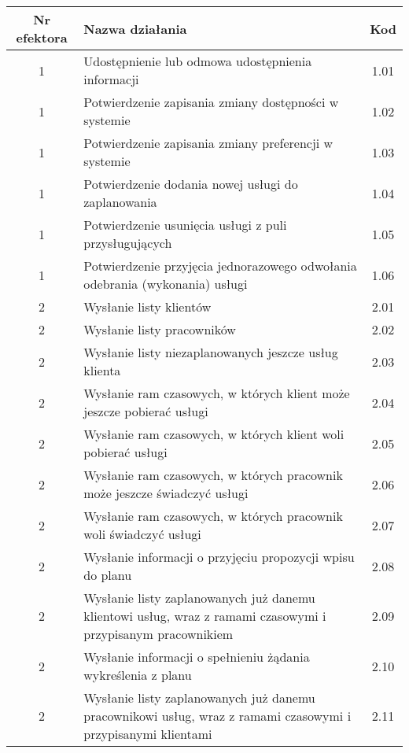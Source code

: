 \begin{tabular}{c|p{5cm}|c}
Nr efektora & Nazwa działania & Kod\\
\hline
1 & Udostępnienie lub odmowa udostępnienia informacji & 1.01\\
1 & Potwierdzenie zapisania zmiany dostępności w systemie & 1.02\\
1 & Potwierdzenie zapisania zmiany preferencji w systemie & 1.03\\
1 & Potwierdzenie dodania nowej usługi do zaplanowania & 1.04\\
1 & Potwierdzenie usunięcia usługi z puli przysługujących & 1.05\\
1 & Potwierdzenie przyjęcia jednorazowego odwołania odebrania (wykonania) usługi & 1.06\\
\hline
2 & Wysłanie listy klientów & 2.01\\
2 & Wysłanie listy pracowników & 2.02\\
2 & Wysłanie listy niezaplanowanych jeszcze usług klienta & 2.03\\
2 & Wysłanie ram czasowych, w których klient może jeszcze pobierać usługi & 2.04\\
2 & Wysłanie ram czasowych, w których klient woli pobierać usługi & 2.05 \\
2 & Wysłanie ram czasowych, w których pracownik może jeszcze świadczyć usługi & 2.06 \\
2 & Wysłanie ram czasowych, w których pracownik woli świadczyć usługi & 2.07\\
2 & Wysłanie informacji o przyjęciu propozycji wpisu do planu & 2.08\\
2 & Wysłanie listy zaplanowanych już danemu klientowi usług, wraz z ramami czasowymi i przypisanym pracownikiem & 2.09\\
2 & Wysłanie informacji o spełnieniu żądania wykreślenia z planu & 2.10\\
2 & Wysłanie listy zaplanowanych już danemu pracownikowi usług, wraz z ramami czasowymi i przypisanymi klientami & 2.11\\
\end{tabular}

